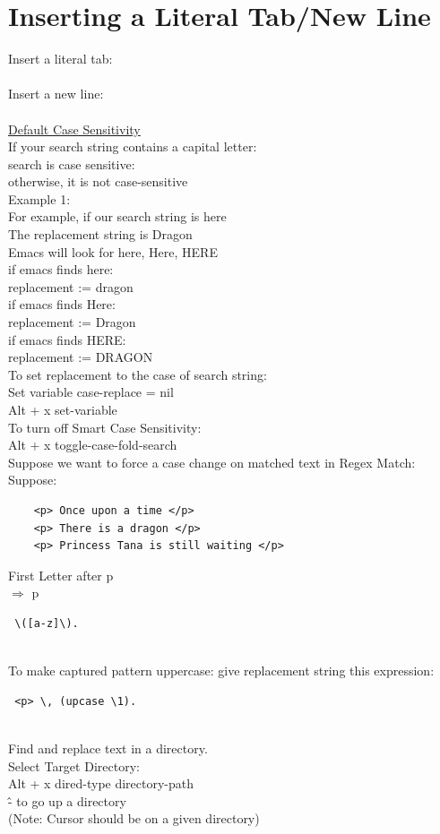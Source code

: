 \documentclass{article}
\begin{document}
\section{Inserting a Literal Tab/New Line}
Insert a literal tab:
\\
[Ctrl + q Ctrl + Tab]
\\
Insert a new line:
\\
[Ctrl + q Return]
\\
\underline{Default Case Sensitivity}
\\
If your search string contains a capital letter:
\\
search is case sensitive:
\\
otherwise, it is not case-sensitive
\\
Example 1:
\\
For example, if our search string is here
\\
The replacement string is Dragon
\\
Emacs will look for {here, Here, HERE}
\\
if emacs finds here:
\\
replacement := dragon
\\
if emacs finds Here:
\\
replacement := Dragon
\\
if emacs finds HERE:
\\
replacement := DRAGON
\\
To set replacement to the case of search string:
\\
Set variable case-replace = nil
\\
Alt + x set-variable
\\
To turn off Smart Case Sensitivity:
\\
Alt + x toggle-case-fold-search
\\
Suppose we want to force a case change on matched text in Regex Match:
\\
Suppose:
\\
\begin{verbatim}
    <p> Once upon a time </p>
    <p> There is a dragon </p>
    <p> Princess Tana is still waiting </p>
\end{verbatim}

First Letter after \<p\>
\\
$\Rightarrow$ \<p\> 
\begin{verbatim} \([a-z]\). \end{verbatim}
\\
To make captured pattern uppercase: give replacement string this expression:
\\
\begin{verbatim} <p> \, (upcase \1).\end{verbatim}
\\
Find and replace text in a directory.
\\
Select Target Directory:
\\
Alt + x dired-type \<directory-path\>
\\
\^ - to go up a directory
\\
(Note: Cursor should be on a given directory)
\\
\end{document}
